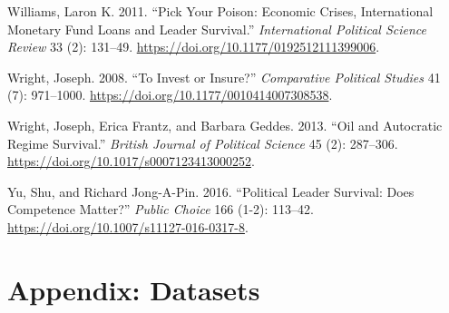 \documentclass[
  12pt,
]{report}
\newlength{\cslhangindent}
\newenvironment{CSLReferences}[2] %
 {\begin{list}{}{%
  \setlength{\itemindent}{0pt}
  \setlength{\leftmargin}{0pt}
  \setlength{\parsep}{0pt}
  \ifodd #1
   \setlength{\leftmargin}{\cslhangindent}
   \setlength{\itemindent}{-1\cslhangindent}
  \fi
  \setlength{\itemsep}{#2\baselineskip}}}
 {\end{list}}
\begin{document}
\begin{CSLReferences}{1}{0}
Williams, Laron K. 2011. {``Pick Your Poison: Economic Crises,
International Monetary Fund Loans and Leader Survival.''}
\emph{International Political Science Review} 33 (2): 131--49.
\url{https://doi.org/10.1177/0192512111399006}.

Wright, Joseph. 2008. {``To Invest or Insure?''} \emph{Comparative
Political Studies} 41 (7): 971--1000.
\url{https://doi.org/10.1177/0010414007308538}.

Wright, Joseph, Erica Frantz, and Barbara Geddes. 2013. {``Oil and
Autocratic Regime Survival.''} \emph{British Journal of Political
Science} 45 (2): 287--306.
\url{https://doi.org/10.1017/s0007123413000252}.

Yu, Shu, and Richard Jong-A-Pin. 2016. {``Political Leader Survival:
Does Competence Matter?''} \emph{Public Choice} 166 (1-2): 113--42.
\url{https://doi.org/10.1007/s11127-016-0317-8}.

\end{CSLReferences}

\chapter*{\texorpdfstring{Appendix\textbf{:
Datasets}}{Appendix: Datasets}}\label{appendix-datasets}
\end{document}
